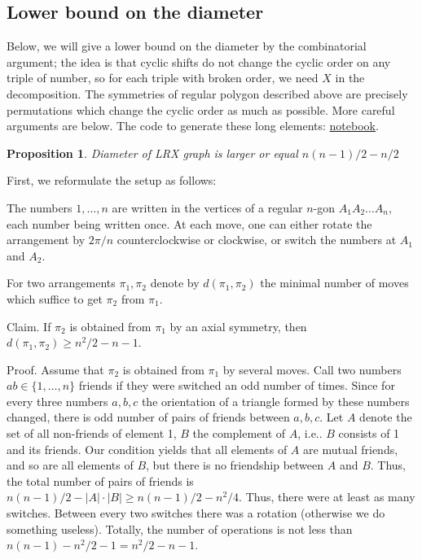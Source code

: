 \documentclass[atmp]{ipart_v1}
\numberwithin{equation}{section}
\theoremstyle{plain}%
\newtheorem{proposition}[theorem]{Proposition}
\begin{document}


\subsection{Lower bound on the diameter}
Below, we will give a lower bound on the diameter by the combinatorial argument; the idea is that cyclic shifts do not change the cyclic order on any triple of number, so for each triple with broken order, we need $X$  in the decomposition. The symmetries of regular polygon described above are precisely  permutations which change the cyclic order as much as possible. More careful arguments are below. The code to generate these long elements: \href{https://www.kaggle.com/code/alexandervc/lrx-long-elements-f-petrov-oeisa186752}{notebook}. 

\begin{proposition}
  Diameter of LRX graph is larger or equal $n(n-1)/2-n/2$ 
\end{proposition}

First, we reformulate the setup as follows:

The numbers $1,\ldots,n$  are written in the vertices of a regular $n$-gon $A_1A_2\ldots A_n$, each number being written once. At each move, one can either rotate the arrangement by $2\pi/n$  counterclockwise or clockwise, or switch the numbers at $A_1$ and $A_2$.

For two arrangements $\pi_1,\pi_2$ denote by $d(\pi_1,\pi_2)$ the minimal number of moves which suffice to get $\pi_2$ from $\pi_1$.

Claim. If $\pi_2$ is obtained from $\pi_1$ by an axial symmetry, then $d(\pi_1,\pi_2)\geqslant n^2/2-n-1$.

Proof. Assume that $\pi_2$ is obtained from $\pi_1$ by several moves. Call two numbers $a b\in \{1,\ldots,n\}$ friends if they were switched an odd number of times. Since for every three numbers $a, b, c$ the orientation of a triangle formed by these numbers changed, there is odd number of pairs of friends between $a, b, c$. Let $A$ denote the set of all non-friends of element 1, $B$ the complement of $A$, i.e.. $B$ consists of 1 and its friends. Our condition yields that all elements of $A$ are mutual friends, and so are all elements of $B$, but there is no friendship between $A$ and $B$. Thus, the total number of pairs of friends is $n(n-1)/2-|A|\cdot |B|\geqslant n(n-1)/2-n^2/4$. Thus, there were at least as many switches. Between every two switches there was a rotation (otherwise we do something useless). Totally, the number of operations is not less than $n(n-1)-n^2/2-1=n^2/2-n-1$.
\end{document}
